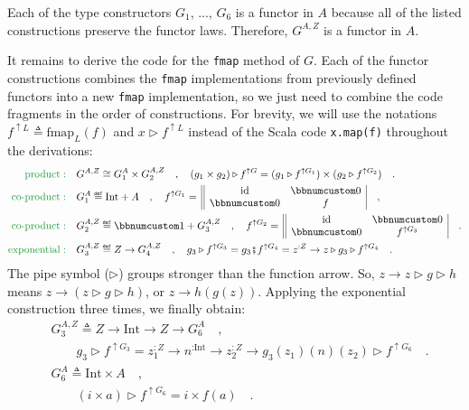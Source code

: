 Each of the type constructors $G_{1}$, ..., $G_{6}$ is a functor
in $A$ because all of the listed constructions preserve the functor
laws. Therefore, $G^{A,Z}$ is a functor in $A$.

It remains to derive the code for the \lstinline!fmap! method of
$G$. Each of the functor constructions combines the \lstinline!fmap!
implementations from previously defined functors into a new \lstinline!fmap!
implementation, so we just need to combine the code fragments in the
order of constructions. For brevity, we will use the notations $f^{\uparrow L}\triangleq\text{fmap}_{L}(f)$
and $x\triangleright f^{\uparrow L}$ instead of the Scala code \lstinline!x.map(f)!
throughout the derivations:
\begin{align*}
{\color{greenunder}\text{product}:}\quad & G^{A,Z}\cong G_{1}^{A}\times G_{2}^{A,Z}\quad,\quad(g_{1}\times g_{2})\triangleright f^{\uparrow G}=(g_{1}\triangleright f^{\uparrow G_{1}})\times(g_{2}\triangleright f^{\uparrow G_{2}})\quad.\\
{\color{greenunder}\text{co-product}:}\quad & G_{1}^{A}\triangleq\text{Int}+A\quad,\quad f^{\uparrow G_{1}}=\,\begin{array}{||cc|}
\text{id} & \bbnum 0\\
\bbnum 0 & f
\end{array}\quad,\\
{\color{greenunder}\text{co-product}:}\quad & G_{2}^{A,Z}\triangleq\bbnum 1+G_{3}^{A,Z}\quad,\quad f^{\uparrow G_{2}}=\,\begin{array}{||cc|}
\text{id} & \bbnum 0\\
\bbnum 0 & f^{\uparrow G_{3}}
\end{array}\quad.\\
{\color{greenunder}\text{exponential}:}\quad & G_{3}^{A,Z}\triangleq Z\rightarrow G_{4}^{A,Z}\quad,\quad g_{3}\triangleright f^{\uparrow G_{3}}=g_{3}\bef f^{\uparrow G_{4}}=z^{:Z}\rightarrow z\triangleright g_{3}\triangleright f^{\uparrow G_{4}}\quad.
\end{align*}
The pipe symbol ($\triangleright$) groups stronger than the function
arrow. So, $z\rightarrow z\triangleright g\triangleright h$
means $z\rightarrow(z\triangleright g\triangleright h)$, or $z\rightarrow h(g(z))$.
Applying the exponential  construction three times, we finally obtain:
\begin{align*}
 & G_{3}^{A,Z}\triangleq Z\rightarrow\text{Int}\rightarrow Z\rightarrow G_{6}^{A}\quad,\\
 & \quad\quad g_{3}\triangleright f^{\uparrow G_{3}}=z_{1}^{:Z}\rightarrow n^{:\text{Int}}\rightarrow z_{2}^{:Z}\rightarrow g_{3}(z_{1})(n)(z_{2})\triangleright f^{\uparrow G_{6}}\quad.\\
 & G_{6}^{A}\triangleq\text{Int}\times A\quad,\\
 & \quad\quad(i\times a)\triangleright f^{\uparrow G_{6}}=i\times f(a)\quad.
\end{align*}
